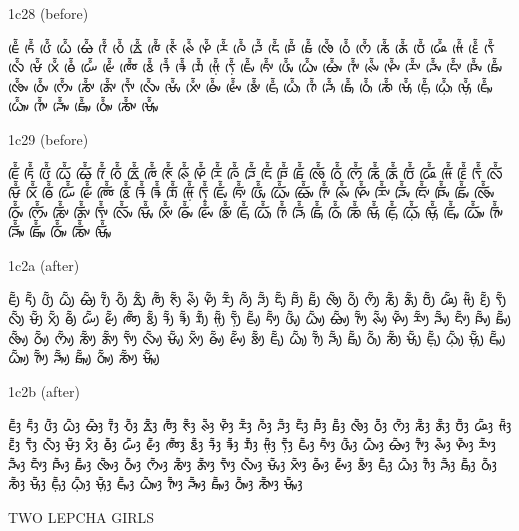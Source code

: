 \noindent
1c28 (before)

\noindent
ᰀᰨᰱᰶ ᰁᰨᰱᰶ ᰂᰨᰱᰶ ᰃᰨᰱᰶ ᰄᰨᰱᰶ ᰅᰨᰱᰶ ᰆᰨᰱᰶ ᰇᰨᰱᰶ ᰈᰨᰱᰶ ᰉᰨᰱᰶ ᰊᰨᰱᰶ ᰋᰨᰱᰶ ᰌᰨᰱᰶ ᰍᰨᰱᰶ ᰎᰨᰱᰶ ᰏᰨᰱᰶ ᰐᰨᰱᰶ ᰑᰨᰱᰶ ᰒᰨᰱᰶ ᰓᰨᰱᰶ ᰔᰨᰱᰶ ᰕᰨᰱᰶ ᰖᰨᰱᰶ ᰗᰨᰱᰶ ᰘᰨᰱᰶ ᰙᰨᰱᰶ ᰚᰨᰱᰶ ᰛᰨᰱᰶ ᰜᰨᰱᰶ ᰝᰨᰱᰶ ᰞᰨᰱᰶ ᰟᰨᰱᰶ ᰠᰨᰱᰶ ᰡᰨᰱᰶ ᰢᰨᰱᰶ ᰣᰨᰱᰶ ᱍᰨᰱᰶ ᱎᰨᰱᰶ ᱏᰨᰱᰶ ᰙ᰷ᰨᰱᰶ ᰛ᰷ᰨᰱᰶ ᰀᰤᰨᰱᰶ ᰁᰤᰨᰱᰶ ᰂᰤᰨᰱᰶ ᰃᰤᰨᰱᰶ ᰄᰤᰨᰱᰶ ᰅᰤᰨᰱᰶ ᰊᰤᰨᰱᰶ ᰋᰤᰨᰱᰶ ᰌᰤᰨᰱᰶ ᰎᰤᰨᰱᰶ ᰏᰤᰨᰱᰶ ᰐᰤᰨᰱᰶ ᰑᰤᰨᰱᰶ ᰒᰤᰨᰱᰶ ᰓᰤᰨᰱᰶ ᰔᰤᰨᰱᰶ ᰕᰤᰨᰱᰶ ᰖᰤᰨᰱᰶ ᰛᰤᰨᰱᰶ ᰜᰤᰨᰱᰶ ᰝᰤᰨᰱᰶ ᰞᰤᰨᰱᰶ ᰟᰤᰨᰱᰶ ᰡᰤᰨᰱᰶ ᰣᰤᰨᰱᰶ ᰀᰥᰨᰱᰶ ᰃᰥᰨᰱᰶ ᰅᰥᰨᰱᰶ ᰎᰥᰨᰱᰶ ᰑᰥᰨᰱᰶ ᰓᰥᰨᰱᰶ ᰕᰥᰨᰱᰶ ᰝᰥᰨᰱᰶ ᰀ᰷ᰥᰨᰱᰶ ᰃ᰷ᰥᰨᰱᰶ ᰝ᰷ᰥᰨᰱᰶ ᰀᰥᰤᰨᰱᰶ ᰃᰥᰤᰨᰱᰶ ᰅᰥᰤᰨᰱᰶ ᰎᰥᰤᰨᰱᰶ ᰑᰥᰤᰨᰱᰶ ᰓᰥᰤᰨᰱᰶ ᰕᰥᰤᰨᰱᰶ ᰝᰥᰤᰨᰱᰶ 

\noindent
1c29 (before)

\noindent
ᰀᰩᰱᰶ ᰁᰩᰱᰶ ᰂᰩᰱᰶ ᰃᰩᰱᰶ ᰄᰩᰱᰶ ᰅᰩᰱᰶ ᰆᰩᰱᰶ ᰇᰩᰱᰶ ᰈᰩᰱᰶ ᰉᰩᰱᰶ ᰊᰩᰱᰶ ᰋᰩᰱᰶ ᰌᰩᰱᰶ ᰍᰩᰱᰶ ᰎᰩᰱᰶ ᰏᰩᰱᰶ ᰐᰩᰱᰶ ᰑᰩᰱᰶ ᰒᰩᰱᰶ ᰓᰩᰱᰶ ᰔᰩᰱᰶ ᰕᰩᰱᰶ ᰖᰩᰱᰶ ᰗᰩᰱᰶ ᰘᰩᰱᰶ ᰙᰩᰱᰶ ᰚᰩᰱᰶ ᰛᰩᰱᰶ ᰜᰩᰱᰶ ᰝᰩᰱᰶ ᰞᰩᰱᰶ ᰟᰩᰱᰶ ᰠᰩᰱᰶ ᰡᰩᰱᰶ ᰢᰩᰱᰶ ᰣᰩᰱᰶ ᱍᰩᰱᰶ ᱎᰩᰱᰶ ᱏᰩᰱᰶ ᰙ᰷ᰩᰱᰶ ᰛ᰷ᰩᰱᰶ ᰀᰤᰩᰱᰶ ᰁᰤᰩᰱᰶ ᰂᰤᰩᰱᰶ ᰃᰤᰩᰱᰶ ᰄᰤᰩᰱᰶ ᰅᰤᰩᰱᰶ ᰊᰤᰩᰱᰶ ᰋᰤᰩᰱᰶ ᰌᰤᰩᰱᰶ ᰎᰤᰩᰱᰶ ᰏᰤᰩᰱᰶ ᰐᰤᰩᰱᰶ ᰑᰤᰩᰱᰶ ᰒᰤᰩᰱᰶ ᰓᰤᰩᰱᰶ ᰔᰤᰩᰱᰶ ᰕᰤᰩᰱᰶ ᰖᰤᰩᰱᰶ ᰛᰤᰩᰱᰶ ᰜᰤᰩᰱᰶ ᰝᰤᰩᰱᰶ ᰞᰤᰩᰱᰶ ᰟᰤᰩᰱᰶ ᰡᰤᰩᰱᰶ ᰣᰤᰩᰱᰶ ᰀᰥᰩᰱᰶ ᰃᰥᰩᰱᰶ ᰅᰥᰩᰱᰶ ᰎᰥᰩᰱᰶ ᰑᰥᰩᰱᰶ ᰓᰥᰩᰱᰶ ᰕᰥᰩᰱᰶ ᰝᰥᰩᰱᰶ ᰀ᰷ᰥᰩᰱᰶ ᰃ᰷ᰥᰩᰱᰶ ᰝ᰷ᰥᰩᰱᰶ ᰀᰥᰤᰩᰱᰶ ᰃᰥᰤᰩᰱᰶ ᰅᰥᰤᰩᰱᰶ ᰎᰥᰤᰩᰱᰶ ᰑᰥᰤᰩᰱᰶ ᰓᰥᰤᰩᰱᰶ ᰕᰥᰤᰩᰱᰶ ᰝᰥᰤᰩᰱᰶ 

\noindent
1c2a (after)

\noindent
ᰀᰪᰲᰶ ᰁᰪᰲᰶ ᰂᰪᰲᰶ ᰃᰪᰲᰶ ᰄᰪᰲᰶ ᰅᰪᰲᰶ ᰆᰪᰲᰶ ᰇᰪᰲᰶ ᰈᰪᰲᰶ ᰉᰪᰲᰶ ᰊᰪᰲᰶ ᰋᰪᰲᰶ ᰌᰪᰲᰶ ᰍᰪᰲᰶ ᰎᰪᰲᰶ ᰏᰪᰲᰶ ᰐᰪᰲᰶ ᰑᰪᰲᰶ ᰒᰪᰲᰶ ᰓᰪᰲᰶ ᰔᰪᰲᰶ ᰕᰪᰲᰶ ᰖᰪᰲᰶ ᰗᰪᰲᰶ ᰘᰪᰲᰶ ᰙᰪᰲᰶ ᰚᰪᰲᰶ ᰛᰪᰲᰶ ᰜᰪᰲᰶ ᰝᰪᰲᰶ ᰞᰪᰲᰶ ᰟᰪᰲᰶ ᰠᰪᰲᰶ ᰡᰪᰲᰶ ᰢᰪᰲᰶ ᰣᰪᰲᰶ ᱍᰪᰲᰶ ᱎᰪᰲᰶ ᱏᰪᰲᰶ ᰙ᰷ᰪᰲᰶ ᰛ᰷ᰪᰲᰶ ᰀᰤᰪᰲᰶ ᰁᰤᰪᰲᰶ ᰂᰤᰪᰲᰶ ᰃᰤᰪᰲᰶ ᰄᰤᰪᰲᰶ ᰅᰤᰪᰲᰶ ᰊᰤᰪᰲᰶ ᰋᰤᰪᰲᰶ ᰌᰤᰪᰲᰶ ᰎᰤᰪᰲᰶ ᰏᰤᰪᰲᰶ ᰐᰤᰪᰲᰶ ᰑᰤᰪᰲᰶ ᰒᰤᰪᰲᰶ ᰓᰤᰪᰲᰶ ᰔᰤᰪᰲᰶ ᰕᰤᰪᰲᰶ ᰖᰤᰪᰲᰶ ᰛᰤᰪᰲᰶ ᰜᰤᰪᰲᰶ ᰝᰤᰪᰲᰶ ᰞᰤᰪᰲᰶ ᰟᰤᰪᰲᰶ ᰡᰤᰪᰲᰶ ᰣᰤᰪᰲᰶ ᰀᰥᰪᰲᰶ ᰃᰥᰪᰲᰶ ᰅᰥᰪᰲᰶ ᰎᰥᰪᰲᰶ ᰑᰥᰪᰲᰶ ᰓᰥᰪᰲᰶ ᰕᰥᰪᰲᰶ ᰝᰥᰪᰲᰶ ᰀ᰷ᰥᰪᰲᰶ ᰃ᰷ᰥᰪᰲᰶ ᰝ᰷ᰥᰪᰲᰶ ᰀᰥᰤᰪᰲᰶ ᰃᰥᰤᰪᰲᰶ ᰅᰥᰤᰪᰲᰶ ᰎᰥᰤᰪᰲᰶ ᰑᰥᰤᰪᰲᰶ ᰓᰥᰤᰪᰲᰶ ᰕᰥᰤᰪᰲᰶ ᰝᰥᰤᰪᰲᰶ 

\noindent
1c2b (after)

\noindent
ᰀᰫᰳᰶ ᰁᰫᰳᰶ ᰂᰫᰳᰶ ᰃᰫᰳᰶ ᰄᰫᰳᰶ ᰅᰫᰳᰶ ᰆᰫᰳᰶ ᰇᰫᰳᰶ ᰈᰫᰳᰶ ᰉᰫᰳᰶ ᰊᰫᰳᰶ ᰋᰫᰳᰶ ᰌᰫᰳᰶ ᰍᰫᰳᰶ ᰎᰫᰳᰶ ᰏᰫᰳᰶ ᰐᰫᰳᰶ ᰑᰫᰳᰶ ᰒᰫᰳᰶ ᰓᰫᰳᰶ ᰔᰫᰳᰶ ᰕᰫᰳᰶ ᰖᰫᰳᰶ ᰗᰫᰳᰶ ᰘᰫᰳᰶ ᰙᰫᰳᰶ ᰚᰫᰳᰶ ᰛᰫᰳᰶ ᰜᰫᰳᰶ ᰝᰫᰳᰶ ᰞᰫᰳᰶ ᰟᰫᰳᰶ ᰠᰫᰳᰶ ᰡᰫᰳᰶ ᰢᰫᰳᰶ ᰣᰫᰳᰶ ᱍᰫᰳᰶ ᱎᰫᰳᰶ ᱏᰫᰳᰶ ᰙ᰷ᰫᰳᰶ ᰛ᰷ᰫᰳᰶ ᰀᰤᰫᰳᰶ ᰁᰤᰫᰳᰶ ᰂᰤᰫᰳᰶ ᰃᰤᰫᰳᰶ ᰄᰤᰫᰳᰶ ᰅᰤᰫᰳᰶ ᰊᰤᰫᰳᰶ ᰋᰤᰫᰳᰶ ᰌᰤᰫᰳᰶ ᰎᰤᰫᰳᰶ ᰏᰤᰫᰳᰶ ᰐᰤᰫᰳᰶ ᰑᰤᰫᰳᰶ ᰒᰤᰫᰳᰶ ᰓᰤᰫᰳᰶ ᰔᰤᰫᰳᰶ ᰕᰤᰫᰳᰶ ᰖᰤᰫᰳᰶ ᰛᰤᰫᰳᰶ ᰜᰤᰫᰳᰶ ᰝᰤᰫᰳᰶ ᰞᰤᰫᰳᰶ ᰟᰤᰫᰳᰶ ᰡᰤᰫᰳᰶ ᰣᰤᰫᰳᰶ ᰀᰥᰫᰳᰶ ᰃᰥᰫᰳᰶ ᰅᰥᰫᰳᰶ ᰎᰥᰫᰳᰶ ᰑᰥᰫᰳᰶ ᰓᰥᰫᰳᰶ ᰕᰥᰫᰳᰶ ᰝᰥᰫᰳᰶ ᰀ᰷ᰥᰫᰳᰶ ᰃ᰷ᰥᰫᰳᰶ ᰝ᰷ᰥᰫᰳᰶ ᰀᰥᰤᰫᰳᰶ ᰃᰥᰤᰫᰳᰶ ᰅᰥᰤᰫᰳᰶ ᰎᰥᰤᰫᰳᰶ ᰑᰥᰤᰫᰳᰶ ᰓᰥᰤᰫᰳᰶ ᰕᰥᰤᰫᰳᰶ ᰝᰥᰤᰫᰳᰶ 

\noindent
TWO LEPCHA GIRLS 

